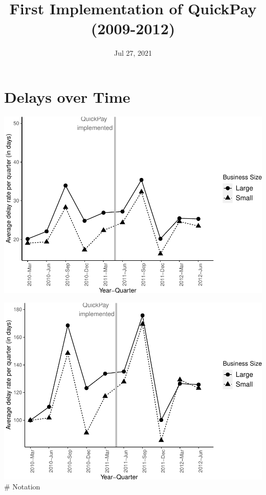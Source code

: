 \documentclass[]{article}
\title{First Implementation of QuickPay (2009-2012)}
\author{}
\date{\vspace{-2.5em}Jul 27, 2021}
\begin{document}
\maketitle

\hypertarget{delays-over-time}{%
\section{Delays over Time}\label{delays-over-time}}

\includegraphics{qp_first_implementation_files/figure-latex/plot-1.pdf}

\includegraphics{qp_first_implementation_files/figure-latex/normalized_plot-1.pdf}
\# Notation
\end{document}
